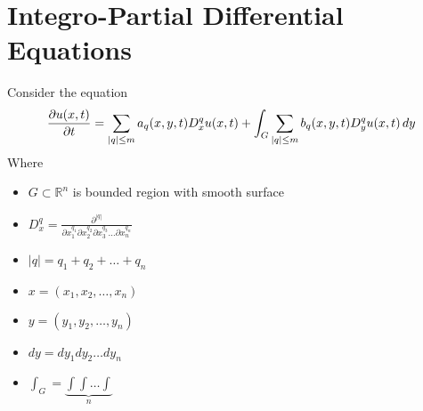 \documentclass[]{article}
\begin{document}

\section{Integro-Partial Differential Equations}
Consider the equation
\begin{equation*}
    \pdv{u(x,t)}{t} = \sum_{|q|\leq m} a_q(x,y,t) D_{x}^{q} u(x,t) + \int_G \sum_{|q|\leq m} b_q(x,y,t) D_{y}^{q} u(x,t) \, dy
\end{equation*}
Where
\begin{itemize}
        \item $G \subset \mathbb{R}^n$ is bounded region with smooth surface
        \item $D_{x}^{q} = \displaystyle \frac{\partial^{|q|}}{\partial x_{1}^{q_1}\partial x_{2}^{q_2}\partial x_{3}^{q_3}\dots \partial x_{n}^{q_n}} $
        \item $|q|=q_1 + q_2 + \dots + q_n$
        \item $x=(x_1,x_2,\dots, x_n)$
        \item $y=(y_1,y_2,\dots ,y_n)$
        \item $dy = dy_1 dy_2 \dots dy_n$
        \item $\int_G = \underbrace{\int\int \dots \int}_{\textit{n}}$
\end{itemize}
\end{document}
